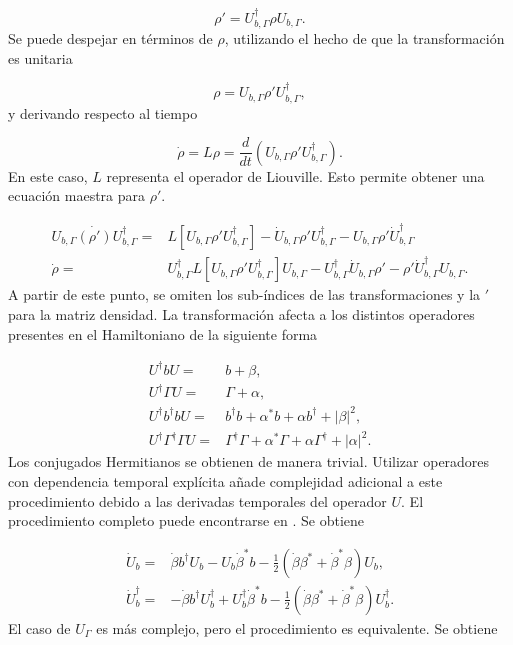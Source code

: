\documentclass[10pt,a4paper]{report}
\begin{document}
\begin{equation}
\rho' = U_{b,\Gamma}^\dagger \rho U_{b,\Gamma}.
\end{equation} Se puede despejar en términos de $\rho$, utilizando el hecho de que la transformación es unitaria

\begin{equation}
\rho = U_{b,\Gamma} \rho' U_{b,\Gamma}^\dagger,
\end{equation}y derivando respecto al tiempo

\begin{equation}
\dot{\rho} = L\rho = \frac{d}{dt}(U_{b,\Gamma} \rho' U_{b,\Gamma}^\dagger).
\end{equation} En este caso, $L$ representa el operador de Liouville. Esto permite obtener una ecuación maestra para $\rho'$. 

\begin{align}
 U_{b,\Gamma} \dot{(\rho')} U_{b,\Gamma}^\dagger =& L[U_{b,\Gamma} \rho' U_{b,\Gamma}^\dagger] - \dot{U}_{b,\Gamma}\rho'U_{b,\Gamma}^\dagger -U_{b,\Gamma} \rho' \dot{U}_{b,\Gamma}^\dagger\\
\dot{\rho} =& U_{b,\Gamma}^\dagger L[U_{b,\Gamma} \rho' U_{b,\Gamma}^\dagger]U_{b,\Gamma}-U_{b,\Gamma}^\dagger\dot{U}_{b,\Gamma}\rho'-\rho'\dot{U}_{b,\Gamma}^\dagger U_{b,\Gamma}.
\end{align} A partir de este punto, se omiten los sub-índices de las transformaciones y la $'$ para la matriz densidad. La transformación afecta a los distintos operadores presentes en el Hamiltoniano de la siguiente forma

\begin{align}
U^\dagger b U =& b + \beta,\\
U^\dagger \Gamma U =& \Gamma + \alpha,\\
U^\dagger b^\dagger b U =& b^\dagger b + \alpha^* b + \alpha b^\dagger +|\beta|^2,\\
U^\dagger \Gamma^\dagger \Gamma U =& \Gamma^\dagger \Gamma + \alpha^* \Gamma + \alpha \Gamma^\dagger +|\alpha|^2.
\end{align} Los conjugados Hermitianos se obtienen de manera trivial. Utilizar operadores con dependencia temporal explícita añade complejidad adicional a este procedimiento debido a las derivadas temporales del operador $U$. El procedimiento completo puede encontrarse en \cite{TesisMaestria}. Se obtiene

\begin{align}
\dot{U}_b=&\dot{\beta} b^\dagger U_b - U_b\dot{\beta}^*b - \frac{1}{2}(\dot{\beta} \beta^*+\dot{\beta}^* \beta)U_b,\\
\dot{U}_b^\dagger=&-\dot{\beta} b^\dagger U_b^\dagger + U_b^\dagger\dot{\beta}^*b - \frac{1}{2}(\dot{\beta} \beta^*+\dot{\beta}^* \beta)U_b^\dagger.
\end{align} El caso de $U_\Gamma$ es más complejo, pero el procedimiento es equivalente. Se obtiene
\end{document}
